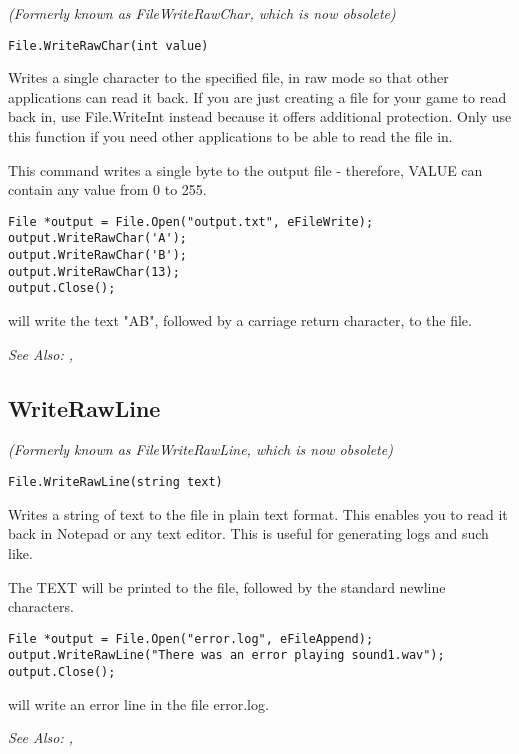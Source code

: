 \it{(Formerly known as FileWriteRawChar, which is now obsolete)}

\begin{verbatim}
File.WriteRawChar(int value)
\end{verbatim}
Writes a single character to the specified file, in raw mode so that other
applications can read it back. If you are just creating a file for your
game to read back in, use File.WriteInt instead because it offers additional
protection. Only use this function if you need other applications to be
able to read the file in.

This command writes a single byte to the output file - therefore, VALUE can
contain any value from 0 to 255.

\begin{verbatim}
File *output = File.Open("output.txt", eFileWrite);
output.WriteRawChar('A');
output.WriteRawChar('B');
output.WriteRawChar(13);
output.Close();
\end{verbatim}
will write the text "AB", followed by a carriage return character, to the file.

\it{See Also:} , 


\subsection{WriteRawLine}\label{File.WriteRawLine}%

\it{(Formerly known as FileWriteRawLine, which is now obsolete)}

\begin{verbatim}
File.WriteRawLine(string text)
\end{verbatim}
Writes a string of text to the file in plain text format. This enables
you to read it back in Notepad or any text editor. This is useful for generating
logs and such like.

The TEXT will be printed to the file, followed by the standard newline characters.

\begin{verbatim}
File *output = File.Open("error.log", eFileAppend);
output.WriteRawLine("There was an error playing sound1.wav");
output.Close();
\end{verbatim}
will write an error line in the file error.log.

\it{See Also:} ,



